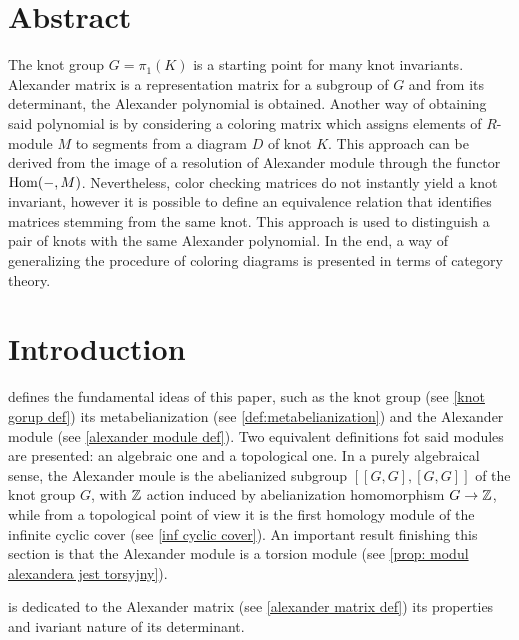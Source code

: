 \section*{Abstract}

The knot group $G=\pi_1(K)$ is a starting point for many knot invariants. Alexander matrix is a representation matrix for a subgroup of $G$ and from its determinant, the Alexander polynomial is obtained. Another way of obtaining said polynomial is by considering a coloring matrix which assigns elements of $R$-module $M$ to segments from a diagram $D$ of knot $K$. This approach can be derived from the image of a resolution of Alexander module through the functor $\operatorname{Hom}(-, M)$. Nevertheless, color checking matrices do not instantly yield a knot invariant, however it is possible to define an equivalence relation that identifies matrices stemming from the same knot. This approach is used to distinguish a pair of knots with the same Alexander polynomial. In the end, a way of generalizing the procedure of coloring diagrams is presented in terms of category theory.

\section*{Introduction}

 defines the fundamental ideas of this paper, such as the knot group (see \cref{knot gorup def}) its metabelianization (see \cref{def:metabelianization}) and the Alexander module (see \cref{alexander module def}). Two equivalent definitions fot said modules are presented: an algebraic one and a topological one. In a purely algebraical sense, the Alexander moule is the abelianized subgroup $[[G, G], [G, G]]$ of the knot group $G$, with $\operatorname{\mathbb{Z}}$ action induced by abelianization homomorphism $G\to \operatorname{\mathbb{Z}}$, while from a topological point of view it is the first homology module of the infinite cyclic cover (see \cref{inf cyclic cover}). An important result finishing this section is that the Alexander module is a torsion module (see \cref{prop: modul alexandera jest torsyjny}).

 is dedicated to the Alexander matrix (see \cref{alexander matrix def}) its properties and ivariant nature of its determinant.


